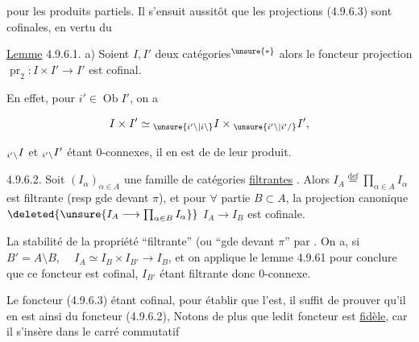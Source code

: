 pour les produits partiels. Il s'ensuit aussitôt que les projections (4.9.6.3) sont cofinales, en vertu du

\uline{Lemme} 4.9.6.1. a) Soient $I,I'$ deux catégories$\vphantom{x}^{\unsure{\ast}}$   alors le foncteur projection $\operatorname{pr}_2:I\times I'\longrightarrow I'$ est cofinal.


 En effet, pour $i'\in\operatorname{Ob}I'$, on a

\[
I\times I'\simeq {}_{\unsure{i'\backslash|i\backslash}}I\times{}_{\unsure{i'\backslash|i'/}}I',
\]

$\vphantom{I}_{i'\backslash}I$ et $\vphantom{I}_{i'\backslash}I'$ étant 0-connexes, il en est de  de leur produit.



\uline{} 4.9.6.2. Soit $(I_\alpha)_{\alpha\in A}$ une famille de catégories \uline{filtrantes} . Alors  $I_A\overset{\mathrm{def}}{=}\prod_{\alpha\in A}I_\alpha$ est filtrante (resp gde devant $\pi$), et pour $\forall$ partie $B\subset A$, la projection canonique $\deleted{\unsure{I_A\longrightarrow\prod_{\alpha\in B}I_\alpha}}$ $I_A\longrightarrow I_B$ est cofinale.


La stabilité de la propriété ``filtrante'' (ou ``gde devant $\pi$'' par . On a, si $B'=A\setminus B$, $\quad I_A\simeq I_B\times I_{B'}\longrightarrow I_B$, et on applique le lemme 4.9.61 pour conclure que ce foncteur est cofinal, $I_{B'}$ étant filtrante donc 0-connexe.

Le foncteur (4.9.6.3) étant cofinal, pour établir que  l'est, il suffit de prouver qu'il en est ainsi du foncteur (4.9.6.2),  Notons de plus que ledit foncteur est \uline{fidèle}, car il s'insère dans le carré commutatif

